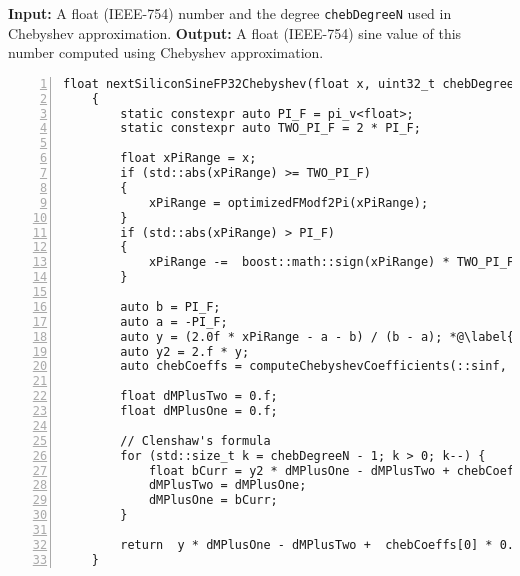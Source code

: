 
\begin{algorithm}
    \caption{Sine using Chebyshev Approximation}
    \begin{algorithmic}[1]
    \State \textbf{Input:} A float (IEEE-754) number and the degree \texttt{chebDegreeN} used in Chebyshev approximation.
    \State \textbf{Output:} A float (IEEE-754) sine value of this number computed using Chebyshev approximation.
\begin{lstlisting}[numbers=left]
    float nextSiliconSineFP32Chebyshev(float x, uint32_t chebDegreeN)
    {
        static constexpr auto PI_F = pi_v<float>;
        static constexpr auto TWO_PI_F = 2 * PI_F;

        float xPiRange = x;
        if (std::abs(xPiRange) >= TWO_PI_F)
        {
            xPiRange = optimizedFModf2Pi(xPiRange);
        }
        if (std::abs(xPiRange) > PI_F)
        {
            xPiRange -=  boost::math::sign(xPiRange) * TWO_PI_F;
        }

        auto b = PI_F;
        auto a = -PI_F;
        auto y = (2.0f * xPiRange - a - b) / (b - a); *@\label{alg:sine_cheb:ln:scaling}@*
        auto y2 = 2.f * y;
        auto chebCoeffs = computeChebyshevCoefficients(::sinf, chebDegreeN, a, b);

        float dMPlusTwo = 0.f;
        float dMPlusOne = 0.f;

        // Clenshaw's formula
        for (std::size_t k = chebDegreeN - 1; k > 0; k--) {
            float bCurr = y2 * dMPlusOne - dMPlusTwo + chebCoeffs[k];
            dMPlusTwo = dMPlusOne;
            dMPlusOne = bCurr;
        }

        return  y * dMPlusOne - dMPlusTwo +  chebCoeffs[0] * 0.5;
    }

\end{lstlisting}
\end{algorithmic}
 \label{alg:sine_cheb_opt}
\end{algorithm}